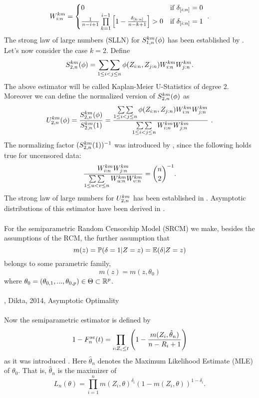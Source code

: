 \[ W_{i:n}^{km} = \begin{cases} 
0 & \textrm{if } \delta_{[i:n]} = 0 \\
\frac{1}{n-i+1}\prod\limits_{k=1}^{i-1}\left[1-\frac{\delta_{[k:n]}}{n-k+1}\right] > 0 & \textrm{if } \delta_{[i:n]} = 1
\end{cases}\textrm{ .}
\]
%
The strong law of large numbers (SLLN) for $S_{1,n}^{km}(\phi)$ has been established by \citet{stute1993strong}.
%
Let's now consider the case $k=2$. Define
\begin{equation*}
S_{2,n}^{km}(\phi) = \mathop{\sum\sum}\limits_{1\leq i < j \leq n} \phi(Z_{i:n}, Z_{j:n}) W_{i:n}^{km} W_{j:n}^{km}.
\end{equation*}
The above estimator will be called Kaplan-Meier U-Statistics of degree 2. Moreover we can define the normalized version of $S_{2,n}^{km}(\phi)$ as
$$U_{2,n}^{km}(\phi) = \frac{S_{2,n}^{km}(\phi)}{S_{2,n}^{km}(1)} = \frac{\mathop{\sum\sum}\limits_{1\leq i < j \leq n} \phi(Z_{i:n}, Z_{j:n}) W_{i:n}^{km} W_{j:n}^{km}}{\mathop{\sum\sum}\limits_{1\leq i < j \leq n} W_{i:n}^{km} W_{j:n}^{km}}\textrm{ .}$$ 
The normalizing factor $(S_{2,n}^{km}(1))^{-1}$ was introduced by \cite{bose1999strong}, since the following holds true for uncensored data:
$$\frac{W_{i:n}^{km}W_{j:n}^{km}}{\mathop{\sum\sum}\limits_{1\leq u < v \leq n}W_{u:n}^{km}W_{v:n}^{km}} = \binom{n}{2}^{-1}\textrm{.}$$ 
The strong law of large numbers for $U_{2,n}^{km}$ has been established in \citet{bose1999strong}. Asymptotic distributions of this estimator have been derived in \citet{bose2002asymptotic}. \\
\\
For the semiparametric Random Censorship Model (SRCM) we make, besides the assumptions of the RCM, the further assumption that 
$$m(z) = \mathbb{P}(\delta=1|Z=z) = \mathbb{E}(\delta|Z=z)$$
belongs to some parametric family, \ie\
$$m(z) = m(z,\theta_0)$$
where $\theta_0=(\theta_{0,1},...,\theta_{0,p})\in \Theta \subset \mathbb{R}^p$. \\
\\
 \cite{dikta1998semiparametric}, Dikta, 2014, Asymptotic Optimality\\
\\
Now the semiparametric estimator is defined by
$$1-F_n^{se}(t) = \prod\limits_{i:Z_i\leq t}\left(1-\frac{m(Z_i,\hat{\theta}_n)}{n-R_i+1}\right)$$
as it was introduced \citet{dikta2000strong}. Here $\hat{\theta}_n$ denotes the Maximum Likelihood Estimate (MLE) of $\theta_0$. That is, $\hat{\theta}_n$ is the maximizer of 
$$L_n(\theta)=\prod\limits_{i=1}^{n} m(Z_i,\theta)^{\delta_i}(1-m(Z_i,\theta))^{1-\delta_i}.$$
